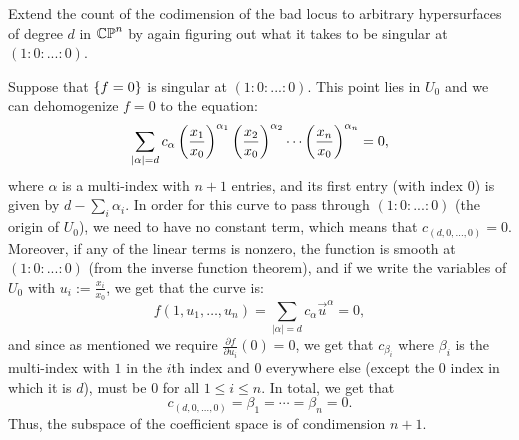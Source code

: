 \documentclass[11pt, a4paper]{article}
\begin{document}
\begin{exercise}
  Extend the count of the codimension of the bad locus to
  arbitrary hypersurfaces of degree $d$ in $\mathbb{CP}^n$ by again figuring out what it
  takes to be singular at $(1 : 0 : . . . : 0)$.
\end{exercise}
\begin{solution}
  Suppose that $\left\{f = 0\right\}$ is singular at $(1 : 0 : . . . : 0)$.
  This point lies in $U_0$ and we can dehomogenize $f = 0$ to the equation:
  \[
    \sum_{|\alpha| = d}
    c_{\alpha}
    \del{\frac{x_1}{x_0}}^{\alpha_1}
    \del{\frac{x_2}{x_0}}^{\alpha_2} \cdots
    \del{\frac{x_n}{x_0}}^{\alpha_n} = 0,
  \]
  where $\alpha$ is a multi-index with $n+1$ entries, and its first
  entry (with index $0$) is given by $d - \sum_i \alpha_i$.
  In order for this curve to pass through $(1 : 0 : . . . : 0)$ (the origin
  of $U_0$), we need to have no constant term,
  which means that $c_{(d,0,\dots,0)} = 0$.
  Moreover, if any of the linear terms is nonzero,
  the function is smooth at $(1 : 0 : . . . : 0)$ (from the inverse
  function theorem), and if we write the variables of $U_0$
  with $u_i := \frac{x_i}{x_0}$, we get that the curve is:
  \[
    f(1,u_1,\dots,u_n) =
    \sum_{|\alpha| = d}
    c_{\alpha}
    \vec u^{\alpha} = 0,
  \]
  and since as mentioned we require $\frac{\partial f}{\partial {u_i}}(0) = 0$,
  we get that $c_{\beta_i}$ where $\beta_i$ is the multi-index with $1$
  in the $i$th index and $0$ everywhere else (except the $0$ index in which
  it is $d$), must be $0$ for all $1 \le i \le n$.
  In total, we get that
  \[
    c_{(d,0,\dots,0)} =
    \beta_1 = \cdots = \beta_{n} = 0.
  \]
  Thus, the subspace of the coefficient space is of condimension $n+1$.
\end{solution}
\end{document}
